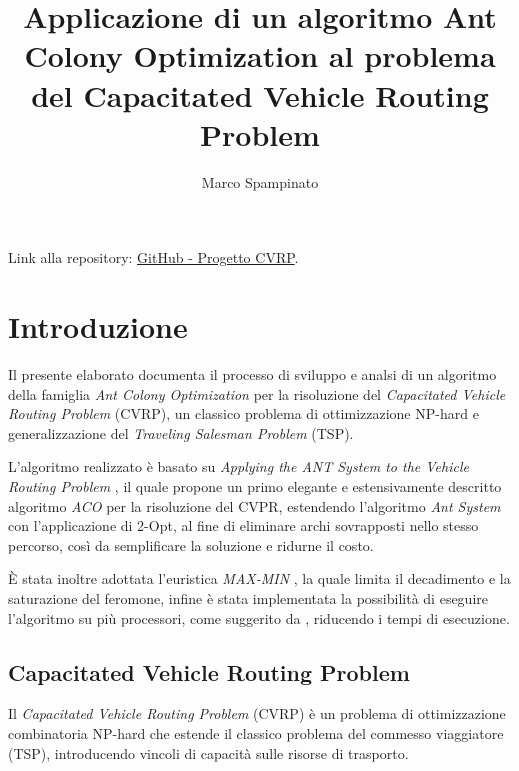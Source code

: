 \documentclass[11pt,a4paper]{article}
\title{\textbf{Applicazione di un algoritmo Ant Colony Optimization al problema del Capacitated Vehicle Routing Problem}}
\author{Marco Spampinato}
\date{}
\begin{document}
\maketitle

Link alla repository: \href{https://github.com/marcospampi/progetto-cvrp}{GitHub - Progetto CVRP}.

\section{Introduzione}
Il presente elaborato documenta il processo di sviluppo e analsi di un algoritmo della famiglia \textit{Ant Colony Optimization} per la risoluzione del \textit{Capacitated Vehicle Routing Problem} (CVRP), un classico problema di ottimizzazione NP-hard e generalizzazione del \textit{Traveling Salesman Problem} (TSP).

\vspace{0.3cm}
\noindent
L'algoritmo realizzato è basato su \textit{Applying the ANT System to the Vehicle Routing Problem} \cite{Bullnheimer},  il quale propone un primo elegante e estensivamente descritto algoritmo \textit{ACO} per la risoluzione del CVPR, estendendo l'algoritmo \textit{Ant System} con l'applicazione di 2-Opt\cite{doi:10.1287/opre.6.6.791}, al fine di eliminare archi sovrapposti nello stesso percorso, così da semplificare la soluzione e ridurne il costo.

\vspace{0.3cm}
\noindent
È stata inoltre adottata l'euristica \textit{MAX-MIN} \cite{STUTZLE2000889}, la quale limita il decadimento e la saturazione del feromone, infine è stata implementata la possibilità di eseguire l'algoritmo su più processori, come suggerito da \cite{polacchi}, riducendo i tempi di esecuzione.
\subsection{Capacitated Vehicle Routing Problem}

Il \textit{Capacitated Vehicle Routing Problem} (CVRP) è un problema di ottimizzazione combinatoria NP-hard che estende il classico problema del commesso viaggiatore (TSP), introducendo vincoli di capacità sulle risorse di trasporto.
\end{document}
